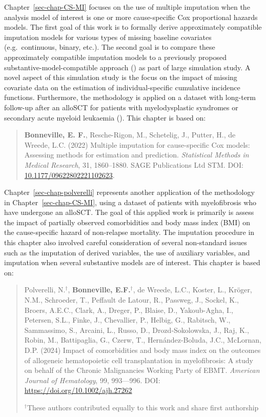 \documentclass[
  letterpaper,
  DIV=11,
  numbers=noendperiod]{scrreprt}
\begin{document}
Chapter~\ref{sec-chap-CS-MI} focuses on the use of multiple imputation
when the analysis model of interest is one or more cause-specific Cox
proportional hazards models. The first goal of this work is to formally
derive approximately compatible imputation models for various types of
missing baseline covariates (e.g.~continuous, binary, etc.). The second
goal is to compare these approximately compatible imputation models to a
previously proposed substantive-model-compatible approach
() as part of large simulation study. A novel aspect of this
simulation study is the focus on the impact of missing covariate data on
the estimation of individual-specific cumulative incidence functions.
Furthermore, the methodology is applied on a dataset with long-term
follow-up after an alloSCT for patients with myelodysplastic syndromes
or secondary acute myeloid leukaemia
(). This chapter is based on:

\begin{quote}
\textbf{Bonneville, E. F.}, Resche-Rigon, M., Schetelig, J., Putter, H.,
de Wreede, L.C. (2022) Multiple imputation for cause-specific Cox
models: Assessing methods for estimation and prediction.
\emph{Statistical Methods in Medical Research}, 31, 1860--1880. SAGE
Publications Ltd STM. DOI:
\href{https://doi.org/10.1177/09622802221102623}{10.1177/09622802221102623}.
\end{quote}

Chapter~\ref{sec-chap-polverelli} represents another application of the
methodology in Chapter~\ref{sec-chap-CS-MI}, using a dataset of patients
with myelofibrosis who have undergone an alloSCT. The goal of this
applied work is primarily is assess the impact of partially observed
comorbidities and body mass index (BMI) on the cause-specific hazard of
non-relapse mortality. The imputation procedure in this chapter also
involved careful consideration of several non-standard issues such as
the imputation of derived variables, the use of auxiliary variables, and
imputation when several substantive models are of interest. This chapter
is based on:

\begin{quote}
Polverelli, N.\(^\dagger\), \textbf{Bonneville, E.F.}\(^\dagger\), de
Wreede, L.C., Koster, L., Kröger, N.M., Schroeder, T., Peffault de
Latour, R., Passweg, J., Sockel, K., Broers, A.E.C., Clark, A., Dreger,
P., Blaise, D., Yakoub-Agha, I., Petersen, S.L., Finke, J., Chevallier,
P., Helbig, G., Rabitsch, W., Sammassimo, S., Arcaini, L., Russo, D.,
Drozd-Sokolowska, J., Raj, K., Robin, M., Battipaglia, G., Czerw, T.,
Hernández-Boluda, J.C., McLornan, D.P. (2024) Impact of comorbidities
and body mass index on the outcomes of allogeneic hematopoietic cell
transplantation in myelofibrosis: A study on behalf of the Chronic
Malignancies Working Party of EBMT. \emph{American Journal of
Hematology}, 99, 993---996. DOI: \url{https://doi.org/10.1002/ajh.27262}

\(^\dagger\)These authors contributed equally to this work and share
first authorship
\end{quote}
\end{document}
